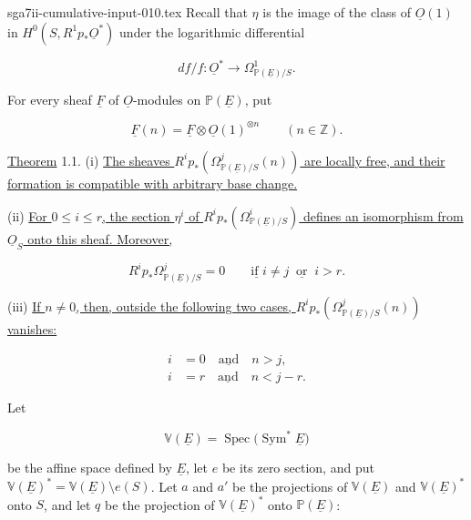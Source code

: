 \begin{filecontents*}{sga7ii-cumulative-input-010.tex}
Recall that $\eta$ is the image of the class of $\underline O(1)$ in
$H^0(S,R^1p_*\underline O^*)$ under the logarithmic differential

\begin{equation*}
df/f:\underline O^*\longrightarrow
\Omega^1_{\mathbb P(\underline E)/S}.
\end{equation*}

For every sheaf $\underline F$ of $\underline O$-modules on
$\mathbb P(\underline E)$, put

\begin{equation*}
\underline F(n)=\underline F\otimes\underline O(1)^{\otimes n}
\qquad(n\in\mathbb Z).
\end{equation*}

\underline{Theorem} 1.1. (i) \underline{The sheaves
$R^ip_*(\Omega^j_{\mathbb P(\underline E)/S}(n))$ are locally free, and their
formation is compatible with arbitrary base change.}

(ii) \underline{For $0\leq i\leq r$, the section $\eta^i$ of
$R^ip_*(\Omega^i_{\mathbb P(\underline E)/S})$ defines an isomorphism from
$\underline O_S$ onto this sheaf. Moreover,}

\begin{equation*}
R^ip_*\Omega^j_{\mathbb P(\underline E)/S}=0
\qquad\underline{\text{if }}i\ne j\ \underline{\text{ or }}\ i>r.
\end{equation*}

(iii) \underline{If $n\ne0$, then, outside the following two cases,
$R^ip_*(\Omega^j_{\mathbb P(\underline E)/S}(n))$ vanishes:}

\begin{align}
i&=0\quad\underline{\text{and}}\quad n>j,
  \tag{iii$_a$}\\
i&=r\quad\underline{\text{and}}\quad n<j-r.
  \tag{iii$_b$}
\end{align}

Let

\begin{equation*}
\mathbb V(\underline E)=\operatorname{Spec}
\bigl(\operatorname{Sym}^*\underline E\bigr)
\end{equation*}

be the affine space defined by $\underline E$, let $e$ be its zero section,
and put
$\mathbb V(\underline E)^*=\mathbb V(\underline E)\setminus e(S)$.  Let $a$
and $a'$ be the projections of $\mathbb V(\underline E)$ and
$\mathbb V(\underline E)^*$ onto $S$, and let $q$ be the projection of
$\mathbb V(\underline E)^*$ onto $\mathbb P(\underline E)$:


\end{filecontents*}
